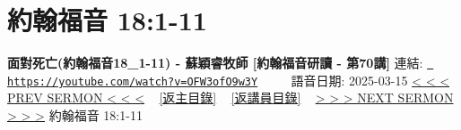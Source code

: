 \documentclass{book}
\begin{document}
\section{約翰福音 18:1-11}
\label{sec:OFW3ofO9w3Y}
\textbf{面對死亡(約翰福音18\_1-11) - 蘇穎睿牧師 [約翰福音研讀 - 第70講]}
\newline
\newline
連結: \href{https://youtube.com/watch?v=OFW3ofO9w3Y}{\texttt{ https://youtube.com/watch?v=OFW3ofO9w3Y}} ~~~~ 語音日期: 2025-03-15 
\newline
\newline
\hyperref[sec:cPwA4cZWWYs]{< < < PREV SERMON < < <}
~
\hyperlink{toc}{[返主目錄]}
~
\hyperref[ch:preacher9]{[返講員目錄]}
~
\hyperref[sec:OtTM_EdQEtA]{> > > NEXT SERMON > > >}
\newline
\newline
約翰福音 18:1-11
\newline
\end{document}
